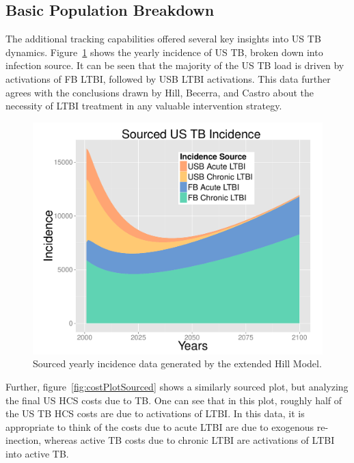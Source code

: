 \documentclass{amsart}
\begin{document}
\subsection{Basic Population Breakdown}
The additional tracking capabilities offered several key insights into US TB
dynamics. Figure~\ref{fig:incPlotSourced} shows the yearly incidence of US TB, broken
down into infection source. It can be seen that the majority of the US TB load
is driven by activations of FB LTBI, followed by USB LTBI activations. This data
further agrees with the conclusions drawn by Hill, Becerra, and Castro about the
necessity of LTBI treatment in any valuable intervention strategy. 
\begin{figure}[h]
  \begin{center}
    \includegraphics[scale=.5]{incPlotSourced}
  \end{center}
  \caption{Sourced yearly incidence data generated by the extended Hill Model.}
  \label{fig:incPlotSourced}
\end{figure}
Further, figure~\ref{fig:costPlotSourced} shows a similarly sourced plot, but analyzing the
final US HCS costs due to TB. One can see that in this plot, roughly half of the
US TB HCS costs are due to activations of LTBI. In this data, it is appropriate
to think of the costs due to acute LTBI are due to exogenous re-inection,
whereas active TB costs due to chronic LTBI are activations of LTBI into active
TB. 
\end{document}
